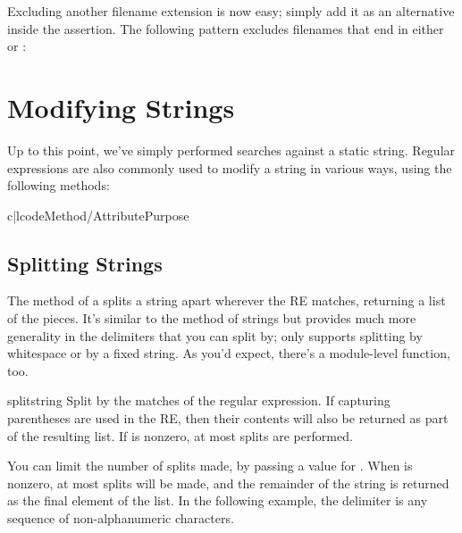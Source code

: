 \documentclass{howto}
\begin{document}
Excluding another filename extension is now easy; simply add it as an
alternative inside the assertion.  The following pattern excludes
filenames that end in either  or :



\section{Modifying Strings}

Up to this point, we've simply performed searches against a static
string.  Regular expressions are also commonly used to modify a string
in various ways, using the following  methods:

\begin{tableii}{c|l}{code}{Method/Attribute}{Purpose}
\end{tableii}


\subsection{Splitting Strings}

The  method of a  splits a string
apart wherever the RE matches, returning a list of the pieces.
It's similar to the  method of strings but
provides much more
generality in the delimiters that you can split by;
 only supports splitting by whitespace or by
a fixed string.  As you'd expect, there's a module-level
 function, too.

\begin{methoddesc}{split}{string }
  Split  by the matches of the regular expression.  If
  capturing parentheses are used in the RE, then their contents will
  also be returned as part of the resulting list.  If 
  is nonzero, at most  splits are performed.
\end{methoddesc}

You can limit the number of splits made, by passing a value for
.  When  is nonzero, at most
 splits will be made, and the remainder of the string is
returned as the final element of the list.  In the following example,
the delimiter is any sequence of non-alphanumeric characters.
\end{document}
